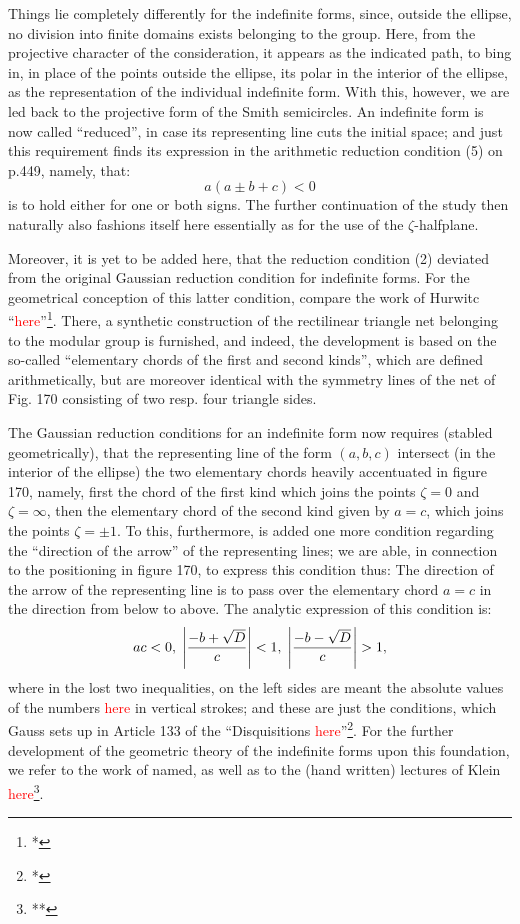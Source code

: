 Things lie completely differently for the indefinite forms, since, outside the ellipse, no division into finite domains exists belonging to the group. Here, from the projective character of the consideration, it appears as the indicated path, to bing in, in place of the points outside the ellipse, its polar in the interior of the ellipse, as the representation of the individual indefinite form. With this, however, we are led back to the projective form of the Smith semicircles. An indefinite form is now called “reduced”, in case its representing line cuts the initial space; and just this requirement finds its expression in the arithmetic reduction condition (5) on p.449, namely, that:
\begin{equation}
a(a\pm b+c)<0
\end{equation}
is to hold either for one or both signs. The further continuation of the study then naturally also fashions itself here essentially as for the use of the $\zeta$-halfplane.

Moreover, it is yet to be added here, that the reduction condition (2) deviated from the original Gaussian reduction condition for indefinite forms. For the geometrical conception of this latter condition, compare the work of Hurwitc “\textcolor{red}{here}”\footnote{*}. There, a synthetic construction of the rectilinear triangle net belonging to the modular group is furnished, and indeed, the development is based on the so-called “elementary chords of the first and second kinds”, which are defined arithmetically, but are moreover identical with the symmetry lines of the net of Fig. 170 consisting of two resp. four triangle sides.

The Gaussian reduction conditions for an indefinite form now requires (stabled geometrically), that the representing line of the form $(a,b,c)$ intersect (in the interior of the ellipse) the two elementary chords heavily accentuated in figure 170, namely, first the chord of the first kind which joins the points $\zeta=0$ and $\zeta=\infty$, then the elementary chord of the second kind given by $a=c$, which joins the points $\zeta=\pm 1$. To this, furthermore, is added one more condition regarding the “direction of the arrow” of the representing lines; we are able, in connection to the positioning in figure 170, to express this condition thus: The direction of the arrow of the representing line is to pass over the elementary chord $a=c$ in the direction from below to above. The analytic expression of this condition is:
\begin{equation}
ac<0,\; \abs{\dfrac{-b+\sqrt{D}}{c}}<1,\;\abs{\dfrac{-b-\sqrt{D}}{c}}>1,
\end{equation}
where in the lost two inequalities, on the left sides are meant the absolute values of the numbers \textcolor{red}{here} in vertical strokes; and these are just the conditions, which Gauss sets up in Article 133 of the “Disquisitions \textcolor{red}{here}”\footnote{*}. For the further development of the geometric theory of the indefinite forms upon this foundation, we refer to the work of named, as well as to the (hand written) lectures of Klein \textcolor{red}{here}\footnote{**}.